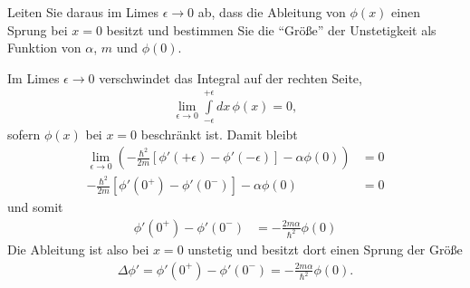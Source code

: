 \documentclass[11pt,a4paper]{scrartcl}
\begin{document}
\begin{enumerate}[label=(\alph*)]
    Leiten Sie daraus im Limes $\epsilon \rightarrow 0$ ab, dass die Ableitung von $\phi(x)$ einen Sprung bei $x = 0$ besitzt und bestimmen Sie die ``Größe'' der Unstetigkeit als Funktion von $\alpha$, $m$ und $\phi(0)$.
    \begin{tcolorbox}[title=Berechnung, breakable]
        Im Limes $\epsilon \to 0$ verschwindet das Integral auf der rechten Seite,
        \begin{align*}
            \lim\limits_{\epsilon\to0}\int\limits_{-\epsilon}^{+\epsilon} dx\, \phi(x)=0,
        \end{align*}
        sofern $\phi(x)$ bei $x=0$ beschränkt ist. Damit bleibt
        \begin{align*}
            \lim\limits_{\epsilon\to0} \left(-\frac{\hbar^2}{2m}\left[\phi'(+\epsilon) - \phi'(-\epsilon)\right] - \alpha \phi(0)\right) &= 0\\
           -\frac{\hbar^2}{2m}\left[\phi'(0^+) - \phi'(0^-)\right] - \alpha \phi(0) &= 0
        \end{align*}
        und somit
        \begin{align*}
           \phi'(0^+) - \phi'(0^-) &= -\frac{2 m \alpha}{\hbar^2} \phi(0)
        \end{align*}
        Die Ableitung ist also bei $x=0$ unstetig und besitzt dort einen Sprung der Größe
        \begin{align*}
            \Delta \phi' = \phi'(0^+) - \phi'(0^-) = -\frac{2 m \alpha}{\hbar^2} \phi(0).
        \end{align*}
    \end{tcolorbox}


\end{enumerate}
\end{document}
